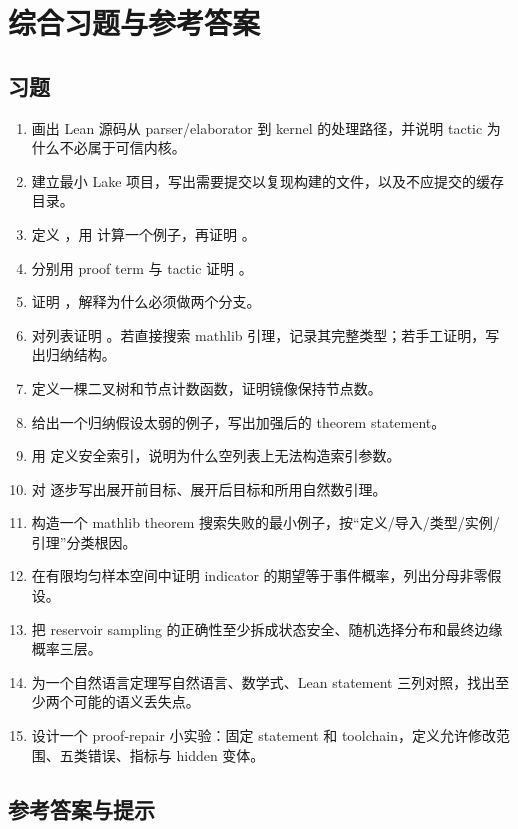 \chapter{综合习题与参考答案}

\section{习题}

\begin{enumerate}[label=\textbf{L\arabic*.}]
  \item 画出 Lean 源码从 parser/elaborator 到 kernel 的处理路径，并说明 tactic 为什么不必属于可信内核。
  \item 建立最小 Lake 项目，写出需要提交以复现构建的文件，以及不应提交的缓存目录。
  \item 定义 ，用  计算一个例子，再证明 。
  \item 分别用 proof term 与 tactic 证明 。
  \item 证明 ，解释为什么必须做两个分支。
  \item 对列表证明 。若直接搜索 mathlib 引理，记录其完整类型；若手工证明，写出归纳结构。
  \item 定义一棵二叉树和节点计数函数，证明镜像保持节点数。
  \item 给出一个归纳假设太弱的例子，写出加强后的 theorem statement。
  \item 用  定义安全索引，说明为什么空列表上无法构造索引参数。
  \item 对  逐步写出展开前目标、展开后目标和所用自然数引理。
  \item 构造一个 mathlib theorem 搜索失败的最小例子，按“定义/导入/类型/实例/引理”分类根因。
  \item 在有限均匀样本空间中证明 indicator 的期望等于事件概率，列出分母非零假设。
  \item 把 reservoir sampling 的正确性至少拆成状态安全、随机选择分布和最终边缘概率三层。
  \item 为一个自然语言定理写自然语言、数学式、Lean statement 三列对照，找出至少两个可能的语义丢失点。
  \item 设计一个 proof-repair 小实验：固定 statement 和 toolchain，定义允许修改范围、五类错误、指标与 hidden 变体。
\end{enumerate}

\section{参考答案与提示}

